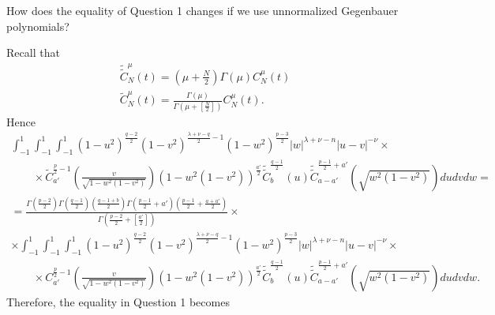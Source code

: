 \documentclass{article}
\begin{document}
\begin{question}
  How does the equality of Question 1 changes if we use unnormalized
  Gegenbauer polynomials?
\end{question}

Recall that
\begin{eqnarray}
  & \widetilde{\tilde{C}}^{\mu}_N (t) = \left( \mu + \frac{N}{2} \right)
  \Gamma (\mu) C^{\mu}_N (t) &  \nonumber\\
  & \tilde{C}_N^{\mu} (t) = \frac{\Gamma (\mu)}{\Gamma \left( \mu + \left[
  \frac{N}{2} \right] \right)} C^{\mu}_N (t) . &  \nonumber
\end{eqnarray}
Hence
\[ \begin{array}{l}
     \int_{- 1}^1 \int_{- 1}^1 \int_{- 1}^1 (1 - u^2)^{\frac{q - 2}{2}} (1 -
     v^2)^{\frac{\lambda + \nu - q}{2} - 1} (1 - w^2)^{\frac{p - 3}{2}} | w
     |^{\lambda + \nu - n} | u - v |^{- \nu} \times\\
     \qquad \times \tilde{C}^{\frac{p}{2} - 1}_{a'} \left( \frac{v}{\sqrt{1 -
     w^2 (1 - v^2)}} \right) (1 - w^2 (1 - v^2))^{\frac{a'}{2}}
     \widetilde{\tilde{C}}^{\frac{q - 1}{2}}_b (u)
     \widetilde{\tilde{C}}^{\frac{p - 1}{2} + a'}_{a - a'} \left( \sqrt{w^2 (1
     - v^2)} \right) d u d v d w =\\
     = \frac{\Gamma \left( \frac{p - 2}{2} \right) \Gamma \left( \frac{q -
     1}{2} \right) \left( \frac{q - 1 + b}{2} \right) \Gamma \left( \frac{p -
     1}{2} + a' \right) \left( \frac{p - 1}{2} + \frac{a + a'}{2}
     \right)}{\Gamma \left( \frac{p - 2}{2} + \left[ \frac{a'}{2} \right]
     \right)} \times\\
     \times \int_{- 1}^1 \int_{- 1}^1 \int_{- 1}^1 (1 - u^2)^{\frac{q - 2}{2}}
     (1 - v^2)^{\frac{\lambda + \nu - q}{2} - 1} (1 - w^2)^{\frac{p - 3}{2}} |
     w |^{\lambda + \nu - n} | u - v |^{- \nu} \times\\
     \qquad \times C^{\frac{p}{2} - 1}_{a'} \left( \frac{v}{\sqrt{1 - w^2 (1 -
     v^2)}} \right) (1 - w^2 (1 - v^2))^{\frac{a'}{2}}
     \widetilde{\tilde{C}}^{\frac{q - 1}{2}}_b (u)
     \widetilde{\tilde{C}}^{\frac{p - 1}{2} + a'}_{a - a'} \left( \sqrt{w^2 (1
     - v^2)} \right) d u d v d w.
   \end{array} \]
Therefore, the equality in Question 1 becomes
\end{document}
